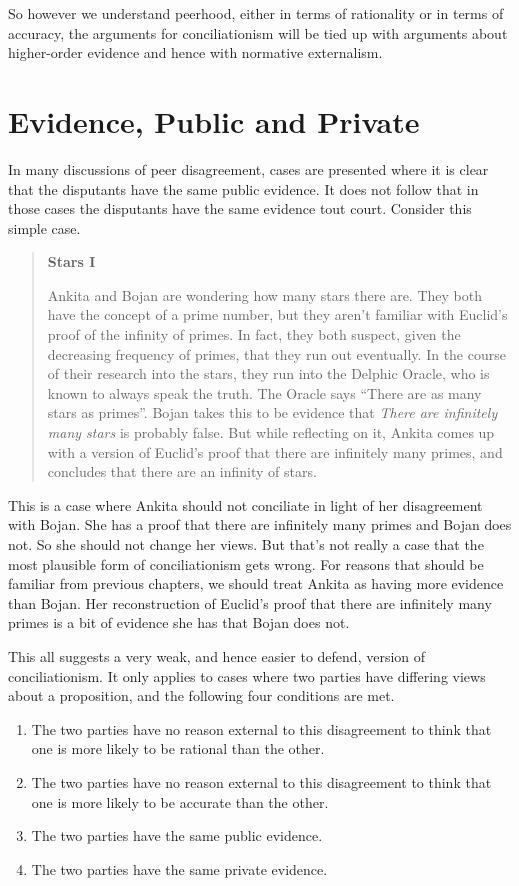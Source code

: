 \documentclass[
  10pt,
  letterpaper,
  twoside]{scrbook}
\providecommand{\tightlist}{%
  \setlength{\itemsep}{0pt}\setlength{\parskip}{0pt}}\usepackage{longtable,booktabs,array}
\begin{document}
So however we understand peerhood, either in terms of rationality or in
terms of accuracy, the arguments for conciliationism will be tied up
with arguments about higher-order evidence and hence with normative
externalism.

\section{Evidence, Public and Private}\label{evidencepublicandprivate}

In many discussions of peer disagreement, cases are presented where it
is clear that the disputants have the same public evidence. It does not
follow that in those cases the disputants have the same evidence tout
court. Consider this simple case.

\begin{quote}
\textbf{Stars I}

{Ankita} and {Bojan} are wondering how many stars there are. They both
have the concept of a prime number, but they aren't familiar with
Euclid's proof of the infinity of primes. In fact, they both suspect,
given the decreasing frequency of primes, that they run out eventually.
In the course of their research into the stars, they run into the
Delphic Oracle, who is known to always speak the truth. The Oracle says
``There are as many stars as primes''. {Bojan} takes this to be evidence
that \emph{There are infinitely many stars} is probably false. But while
reflecting on it, {Ankita} comes up with a version of Euclid's proof
that there are infinitely many primes, and concludes that there are an
infinity of stars.
\end{quote}

This is a case where {Ankita} should not conciliate in light of her
disagreement with {Bojan}. She has a proof that there are infinitely
many primes and {Bojan} does not. So she should not change her views.
But that's not really a case that the most plausible form of
conciliationism gets wrong. For reasons that should be familiar from
previous chapters, we should treat {Ankita} as having more evidence than
{Bojan}. Her reconstruction of Euclid's proof that there are infinitely
many primes is a bit of evidence she has that {Bojan} does not.

This all suggests a very weak, and hence easier to defend, version of
conciliationism. It only applies to cases where two parties have
differing views about a proposition, and the following four conditions
are met.

\begin{enumerate}
\def\labelenumi{\arabic{enumi}.}
\tightlist
\item
  The two parties have no reason external to this disagreement to think
  that one is more likely to be rational than the other.
\item
  The two parties have no reason external to this disagreement to think
  that one is more likely to be accurate than the other.
\item
  The two parties have the same public evidence.
\item
  The two parties have the same private evidence.
\end{enumerate}
\end{document}
